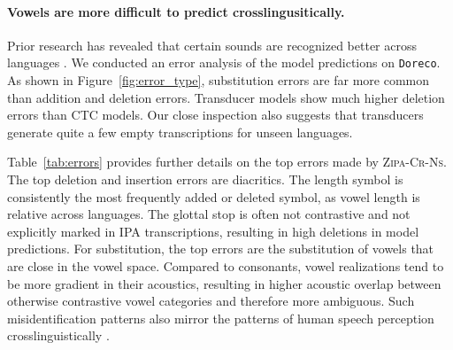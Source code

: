 \documentclass[11pt]{article}
\begin{document}
\paragraph{Vowels are more difficult to predict crosslingusitically.} Prior research has revealed that certain sounds are recognized better across languages \cite{zelasko2022discovering}. We conducted an error analysis of the model predictions on \texttt{Doreco}. As shown in Figure~\ref{fig:error_type}, substitution errors are far more common than addition and deletion errors. Transducer models show much higher deletion errors than CTC models. Our close inspection also suggests that transducers generate quite a few empty transcriptions for unseen languages.  

Table~\ref{tab:errors} provides further details on the top errors made by \textsc{Zipa-Cr-Ns}. The top deletion and insertion errors are diacritics. The length symbol \textipa{:} is consistently the most frequently added or deleted symbol, as vowel length is relative across languages. The glottal stop  is often not contrastive and not explicitly marked in IPA transcriptions, resulting in high deletions in model predictions. For substitution, the top errors are the substitution of vowels that are close in the vowel space. Compared to consonants, vowel realizations tend to be more gradient in their acoustics, resulting in higher acoustic overlap between otherwise contrastive vowel categories and therefore more ambiguous. Such misidentification patterns also mirror the patterns of human speech perception crosslinguistically \cite{sebastian2005cross}. 




\end{document}
